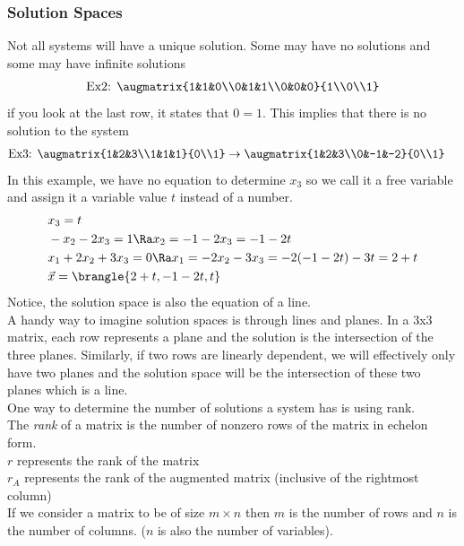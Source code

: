 \subsubsection{Solution Spaces}
Not all systems will have a unique solution. Some may have no solutions and some may have infinite solutions
\begin{align*}
    \text{Ex2: }\augmatrix{1&1&0\\0&1&1\\0&0&0}{1\\0\\1}
\end{align*}
if you look at the last row, it states that $0=1$. This implies that there is no solution to the system
\begin{align*}
    \text{Ex3: }&\augmatrix{1&2&3\\1&1&1}{0\\1}\to\augmatrix{1&2&3\\0&-1&-2}{0\\1}
\end{align*}
In this example, we have no equation to determine $x_3$ so we call it a free variable and assign it a variable value $t$ instead of a number.
\begin{align*}
    &x_3=t\\
    &-x_2-2x_3=1\Ra x_2=-1-2x_3=-1-2t\\
    &x_1+2x_2+3x_3=0\Ra x_1=-2x_2-3x_3=-2(-1-2t)-3t=2+t\\
    &\vec{x}=\brangle{2+t,-1-2t,t}
\end{align*}
Notice, the solution space is also the equation of a line.\\
A handy way to imagine solution spaces is through lines and planes. In a 3x3 matrix, each row represents a plane and the solution is the intersection of the three planes. Similarly, if two rows are linearly dependent, we will effectively only have two planes and the solution space will be the intersection of these two planes which is a line.\\
One way to determine the number of solutions a system has is using rank.\\
The \textit{rank} of a matrix is the number of nonzero rows of the matrix in echelon form.\\
$r$ represents the rank of the matrix\\
$r_A$ represents the rank of the augmented matrix (inclusive of the rightmost column)\\
If we consider a matrix to be of size $m\times n$ then $m$ is the number of rows and $n$ is the number of columns. ($n$ is also the number of variables).
